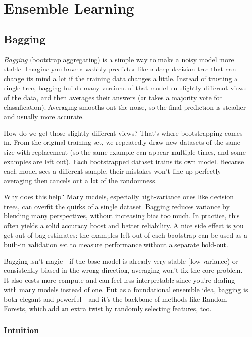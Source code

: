 \chapter{Ensemble Learning}

\section{Bagging}

\textit{Bagging} (bootstrap aggregating) is a simple way to make a noisy model more stable. Imagine you have a wobbly predictor-like a deep decision tree-that can change its mind a lot if the training data changes a little. Instead of trusting a single tree, bagging builds many versions of that model on slightly different views of the data, and then averages their answers (or takes a majority vote for classification). Averaging smooths out the noise, so the final prediction is steadier and usually more accurate.


How do we get those slightly different views? That's where bootstrapping comes in. From the original training set, we repeatedly draw new datasets of the same size with replacement (so the same example can appear multiple times, and some examples are left out). Each bootstrapped dataset trains its own model. Because each model sees a different sample, their mistakes won't line up perfectly—averaging then cancels out a lot of the randomness.

Why does this help? Many models, especially high-variance ones like decision trees, can overfit the quirks of a single dataset. Bagging reduces variance by blending many perspectives, without increasing bias too much. In practice, this often yields a solid accuracy boost and better reliability. A nice side effect is you get out-of-bag estimates: the examples left out of each bootstrap can be used as a built-in validation set to measure performance without a separate hold-out.

Bagging isn't magic—if the base model is already very stable (low variance) or consistently biased in the wrong direction, averaging won't fix the core problem. It also costs more compute and can feel less interpretable since you're dealing with many models instead of one. But as a foundational ensemble idea, bagging is both elegant and powerful—and it's the backbone of methods like Random Forests, which add an extra twist by randomly selecting features, too.

\subsection{Intuition}


